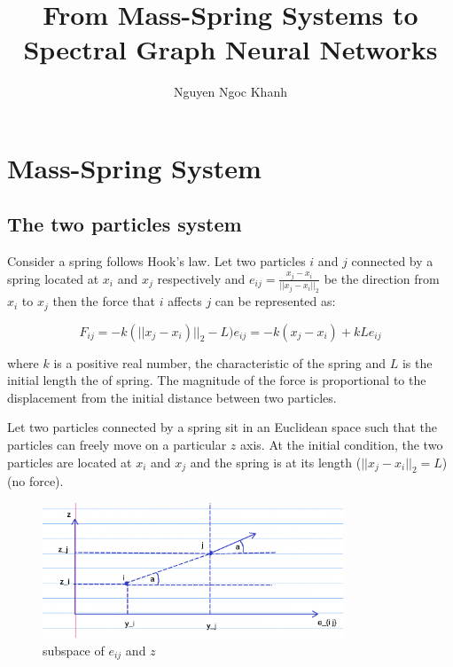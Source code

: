 \documentclass{article}
\title{From Mass-Spring Systems to Spectral Graph Neural Networks}
\author{Nguyen Ngoc Khanh}
\begin{document}
    \maketitle


    \section{Mass-Spring System}

    \subsection{The two particles system}

    Consider a spring follows Hook's law. Let two particles $i$ and $j$ connected by a spring located at $x_i$ and $x_j$ respectively and $e_{i j} = \frac{x_j - x_i}{||x_j - x_i||_2}$ be the direction from $x_i$ to $x_j$ then the force that $i$ affects $j$ can be represented as:

    \begin{equation}
        F_{i j} = - k (||x_j - x_i)||_2 - L) e_{i j} = - k (x_j - x_i) + k L e_{i j}
    \end{equation}

    where $k$ is a positive real number, the characteristic of the spring and $L$ is the initial length the of spring. The magnitude of the force is proportional to the displacement from the initial distance between two particles.

    Let two particles connected by a spring sit in an Euclidean space such that the particles can freely move on a particular $z$ axis. At the initial condition, the two particles are located at $x_i$ and $x_j$ and the spring is at its length ($||x_j - x_i||_2 = L$) (no force).

    \begin{figure}[h!]
        \centering
        \includegraphics[width=0.8\textwidth]{fig1.png}
        \caption{subspace of $e_{i j}$ and $z$}
        \label{fig:fig1}
    \end{figure}
\end{document}
